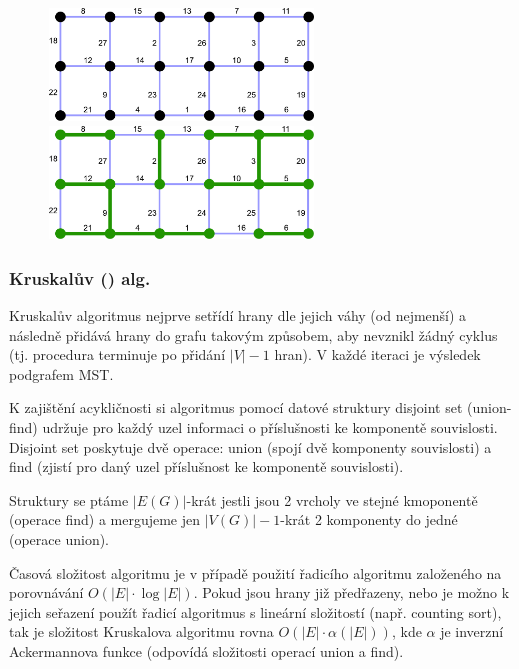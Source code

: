 \begin{figure}[h]
    \begin{center}
        \includegraphics[width=70mm]{spolecne/02/images/boruvka01}
        \hspace{10px}
        \includegraphics[width=70mm]{spolecne/02/images/boruvka02}
    \end{center}
\end{figure}

\subsubsection{Kruskalův () alg.}

Kruskalův algoritmus nejprve setřídí hrany dle jejich váhy (od nejmenší) a následně přidává hrany do grafu takovým způsobem, aby nevznikl žádný cyklus (tj. procedura terminuje po přidání $\vert V \vert -1$ hran). V každé iteraci je výsledek podgrafem MST.

K zajištění acykličnosti si algoritmus pomocí datové struktury disjoint set (union-find) udržuje pro každý uzel informaci o příslušnosti ke komponentě souvislosti. Disjoint set poskytuje dvě operace: union (spojí dvě komponenty souvislosti) a find (zjistí pro daný uzel příslušnost ke komponentě souvislosti).

Struktury se ptáme $\vert E(G)\vert$-krát jestli jsou 2 vrcholy ve stejné kmoponentě (operace find) a mergujeme jen $\vert V(G)\vert -1$-krát 2 komponenty do jedné (operace union).

Časová složitost algoritmu je v případě použití řadicího algoritmu založeného na porovnávání $O(\vert E\vert \cdot \log \vert E \vert)$. Pokud jsou hrany již předřazeny, nebo je možno k jejich seřazení použít řadicí algoritmus s lineární složitostí (např. counting sort), tak je složitost Kruskalova algoritmu rovna $O(\vert E\vert \cdot \alpha(\vert E \vert))$, kde $\alpha$ je inverzní Ackermannova funkce (odpovídá složitosti operací union a find).

